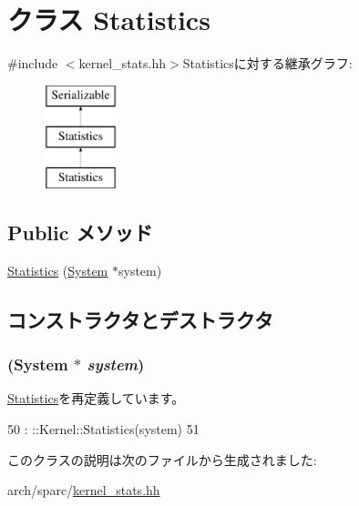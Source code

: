 \hypertarget{classSparcISA_1_1Kernel_1_1Statistics}{
\section{クラス Statistics}
\label{classSparcISA_1_1Kernel_1_1Statistics}
}


{\ttfamily \#include $<$kernel\_\-stats.hh$>$}Statisticsに対する継承グラフ:\begin{figure}[H]
\begin{center}
\leavevmode
\includegraphics[height=3cm]{classSparcISA_1_1Kernel_1_1Statistics}
\end{center}
\end{figure}
\subsection*{Public メソッド}
\begin{DoxyCompactItemize}
\item 
\hyperlink{classSparcISA_1_1Kernel_1_1Statistics_a83aac6d65afe578fbf92b926ce7c1c3c}{Statistics} (\hyperlink{classSystem}{System} $\ast$system)
\end{DoxyCompactItemize}


\subsection{コンストラクタとデストラクタ}
\hypertarget{classSparcISA_1_1Kernel_1_1Statistics_a83aac6d65afe578fbf92b926ce7c1c3c}{
\subsubsection[{Statistics}]{ ({\bf System} $\ast$ {\em system})}}
\label{classSparcISA_1_1Kernel_1_1Statistics_a83aac6d65afe578fbf92b926ce7c1c3c}


\hyperlink{classKernel_1_1Statistics_a83aac6d65afe578fbf92b926ce7c1c3c}{Statistics}を再定義しています。


\begin{DoxyCode}
50                                : ::Kernel::Statistics(system)
51     {}
\end{DoxyCode}


このクラスの説明は次のファイルから生成されました:\begin{DoxyCompactItemize}
\item 
arch/sparc/\hyperlink{arch_2sparc_2kernel__stats_8hh}{kernel\_\-stats.hh}\end{DoxyCompactItemize}
